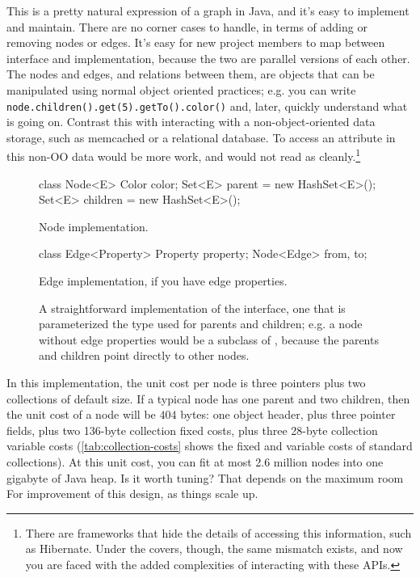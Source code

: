 This is a pretty natural expression of a graph in Java, and it's easy to
implement and maintain. There are no corner cases to handle, in terms of adding
or removing nodes or edges. It's easy for new project members to map between
interface and implementation, because the two are parallel versions of each
other. The nodes and edges, and relations between them, are objects that can be
manipulated using normal object oriented practices; e.g. you can write
\texttt{node.children().get(5).getTo()\-.color()} and, later, quickly
understand what is going on. Contrast this with interacting with a
non-object-oriented data storage, such as
memcached\cite{memcached} or a relational database. To access
an attribute in this non-OO data would be more work, and would not read as
cleanly.\footnote{There are frameworks that hide the details of accessing this
information, such as Hibernate\cite{hibernate}. Under the covers, though, the
same mismatch exists, and now you are faced with the added complexities of
interacting with these APIs.}

\begin{figure}
\centering
\begin{subfloat}
\begin{minipage}[b]{0.59\textwidth}
\begin{framedlisting}
class Node<E> {
   Color color;
   Set<E> parent = new HashSet<E>();
   Set<E> children = new HashSet<E>();
}
\end{framedlisting}
\end{minipage}
\caption{Node implementation.}
\end{subfloat}
\begin{subfloat}
\begin{minipage}[b]{0.33\textwidth}
\begin{framedlisting}
class Edge<Property> {
   Property property;
   Node<Edge> from, to;
}
\end{framedlisting}
\end{minipage}
\caption{Edge implementation, if you have edge properties.}
\end{subfloat}
\caption{A straightforward implementation of the  interface,
one that is parameterized the type used for parents and
children; e.g. a node without edge properties would be a subclass of
, because the parents and children point directly to other
nodes.}
\label{fig:node-obvious-impl}
\end{figure}

In this implementation, the unit cost per node is three pointers plus two
collections of default size. If a typical node has one parent and two children,
then the unit cost of a node will be $404$ bytes: one object header, plus three
pointer fields, plus two 136-byte collection fixed costs, plus three 28-byte
collection variable costs (\autoref{tab:collection-costs} shows the fixed and
variable costs of standard collections). At this unit cost, you can fit at most
2.6 million nodes into one gigabyte of Java heap. Is it worth tuning? That
depends on the maximum room For improvement of this design, as things scale up.

